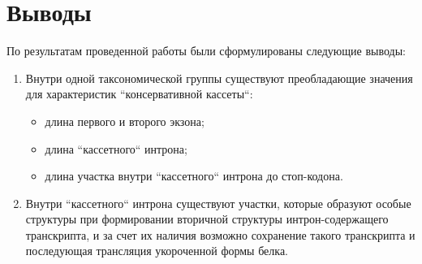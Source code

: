 \clearpage
\section{Выводы}

По результатам проведенной работы были сформулированы следующие выводы:

\begin{enumerate}[left=\parindent]
    \item Внутри одной таксономической группы существуют преобладающие значения для характеристик ``консервативной кассеты``:
    \begin{itemize}
        \item длина первого и второго экзона;
        \item длина ``кассетного`` интрона;
        \item длина участка внутри ``кассетного`` интрона до стоп-кодона.
    \end{itemize}
    \item Внутри ``кассетного`` интрона существуют участки, которые образуют особые структуры при формировании вторичной структуры интрон-содержащего транскрипта, и за счет их наличия возможно сохранение такого транскрипта и последующая трансляция укороченной формы белка.
\end{enumerate}
